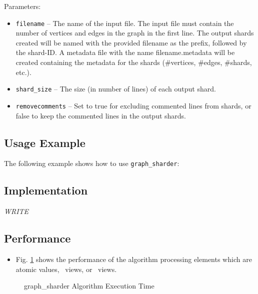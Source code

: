 Parameters:
\begin{itemize}
\item
\texttt{filename} --
The name of the input file. The input file must contain the number of vertices and edges in the graph in the first line. The output shards created will be named with the provided filename as the prefix, followed by the shard-ID. A metadata file with the name filename.metadata will be created containing the metadata for the shards (\#vertices, \#edges, \#shards, etc.).
\item
\texttt{shard\_size} --
The size (in number of lines) of each output shard.
\item
\texttt{removecomments} --
Set to true for excluding commented lines from shards, or false to keep the commented lines in the output shards.
\end{itemize}

\subsection{Usage Example} \label{sec-shard-graf-alg-use}

The following example shows how to use 
\texttt{graph\_sharder}:


\subsection{Implementation} \label{sec-shard-graf-alg-impl}

\textit{WRITE}

\subsection{Performance} \label{sec-shard-graf-alg-perf}

\begin{itemize}
\item
Fig. \ref{fig:shard-graf-alg-exec-exper}
shows the performance of the algorithm processing
elements which are atomic values, \stl\ views, or \stapl\ views.
\end{itemize}

\begin{figure}[p]
\caption{ graph\_sharder Algorithm Execution Time}
\label{fig:shard-graf-alg-exec-exper}
\end{figure}

